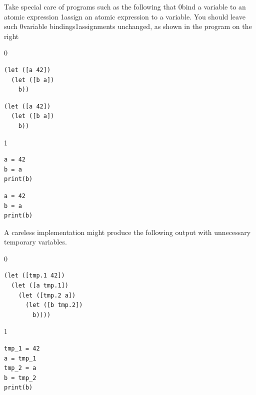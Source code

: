 \documentclass[7x10,nocrop]{TimesAPriori_MIT}%
\def\racketEd{0}
\def\pythonEd{1}
\def\edition{1}
\newcommand{\racket}[1]{{\if\edition\racketEd{#1}\fi}}
\newcommand{\python}[1]{{\if\edition\pythonEd #1\fi}}
\begin{document}
Take special care of programs such as the following that
%
\racket{bind a variable to an atomic expression}
%
\python{assign an atomic expression to a variable}.
%
You should leave such \racket{variable bindings}\python{assignments}
unchanged, as shown in the program on the right\\
%
{\if\edition\racketEd
\begin{transformation}
\begin{lstlisting}
(let ([a 42])
  (let ([b a])
    b))
\end{lstlisting}
\compilesto
\begin{lstlisting}
(let ([a 42])
  (let ([b a])
    b))
\end{lstlisting}
\end{transformation}
\fi}
{\if\edition\pythonEd
\begin{transformation}
\begin{lstlisting}
a = 42
b = a
print(b)
\end{lstlisting}
\compilesto
\begin{lstlisting}
a = 42
b = a
print(b)
\end{lstlisting}
\end{transformation}
\fi}
%
\noindent A careless implementation might produce the following output with
unnecessary temporary variables.
\begin{center}
\begin{minipage}{0.4\textwidth}
{\if\edition\racketEd
\begin{lstlisting}
(let ([tmp.1 42])
  (let ([a tmp.1])
    (let ([tmp.2 a])
      (let ([b tmp.2])
        b))))
\end{lstlisting}
\fi}
{\if\edition\pythonEd
\begin{lstlisting}
tmp_1 = 42
a = tmp_1
tmp_2 = a
b = tmp_2
print(b)
\end{lstlisting}
\fi}
\end{minipage}
\end{center}
\end{document}
